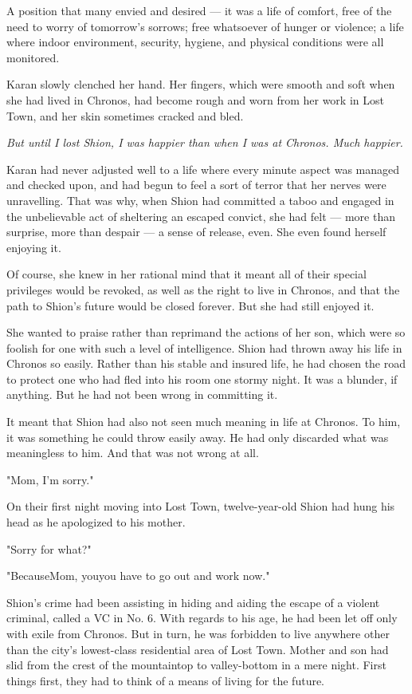 A position that many envied and desired --- it was a life of comfort, free
of the need to worry of tomorrow's sorrows; free whatsoever of hunger or
violence; a life where indoor environment, security, hygiene, and
physical conditions were all monitored.

Karan slowly clenched her hand. Her fingers, which were smooth and soft
when she had lived in Chronos, had become rough and worn from her work
in Lost Town, and her skin sometimes cracked and bled.

\emph{But until I lost Shion, I was happier than when I was at Chronos. Much
happier.}

Karan had never adjusted well to a life where every minute aspect was
managed and checked upon, and had begun to feel a sort of terror that
her nerves were unravelling. That was why, when Shion had committed a
taboo and engaged in the unbelievable act of sheltering an escaped
convict, she had felt --- more than surprise, more than despair --- a sense
of release, even. She even found herself enjoying it.

Of course, she knew in her rational mind that it meant all of their
special privileges would be revoked, as well as the right to live in
Chronos, and that the path to Shion's future would be closed forever.
But she had still enjoyed it.

She wanted to praise rather than reprimand the actions of her son, which
were so foolish for one with such a level of intelligence. Shion had
thrown away his life in Chronos so easily. Rather than his stable and
insured life, he had chosen the road to protect one who had fled into
his room one stormy night. It was a blunder, if anything. But he had not
been wrong in committing it.

It meant that Shion had also not seen much meaning in life at Chronos.
To him, it was something he could throw easily away. He had only
discarded what was meaningless to him. And that was not wrong at all.

"Mom, I'm sorry."

On their first night moving into Lost Town, twelve-year-old Shion had
hung his head as he apologized to his mother.

"Sorry for what?"

"Because\el Mom, you\el you have to go out and work now."

Shion's crime had been assisting in hiding and aiding the escape of a
violent criminal, called a VC in No. 6. With regards to his age, he had
been let off only with exile from Chronos. But in turn, he was forbidden
to live anywhere other than the city's lowest-class residential area of
Lost Town. Mother and son had slid from the crest of the mountaintop to
valley-bottom in a mere night. First things first, they had to think of
a means of living for the future.

